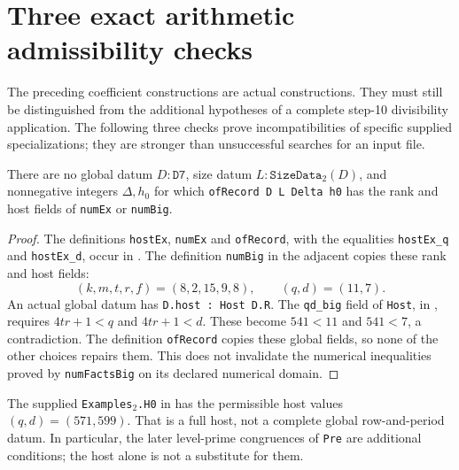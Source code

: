 \section{Three exact arithmetic admissibility checks}
\label{sec:arithmetic-admissibility}

The preceding coefficient constructions are actual constructions.
They must still be distinguished from the additional hypotheses of
a complete step-10 divisibility application. The following three
checks prove incompatibilities of specific supplied specializations;
they are stronger than unsuccessful searches for an input file.

\begin{proposition}
There are no global datum $D:\texttt{D7}$, size datum
$L:\texttt{SizeData}_2(D)$, and nonnegative integers
$\Delta,h_0$ for which \texttt{ofRecord D L Delta h0} has
the rank and host fields of \texttt{numEx} or \texttt{numBig}.
\end{proposition}
\begin{proof}
The definitions \texttt{hostEx}, \texttt{numEx} and
\texttt{ofRecord}, with the equalities \texttt{hostEx\_q} and
\texttt{hostEx\_d}, occur in
.
The definition \texttt{numBig} in the adjacent
 copies these rank and host fields:
\[
 (k,m,t,r,f)=(8,2,15,9,8),\qquad(q,d)=(11,7).
\]
An actual global datum has \texttt{D.host : Host D.R}.
The \texttt{qd\_big} field of \texttt{Host}, in
, requires
$4tr+1<q$ and $4tr+1<d$. These become $541<11$ and
$541<7$, a contradiction. The definition \texttt{ofRecord}
copies these global fields, so none of the other choices repairs
them. This does not invalidate the numerical inequalities proved
by \texttt{numFactsBig} on its declared numerical domain.
\end{proof}

The supplied \texttt{Examples}\(_2\)\texttt{.H0} in
has the permissible host values $(q,d)=(571,599)$. That is a full
host, not a complete global row-and-period datum. In particular,
the later level-prime congruences of \texttt{Pre} are additional
conditions; the host alone is not a substitute for them.

